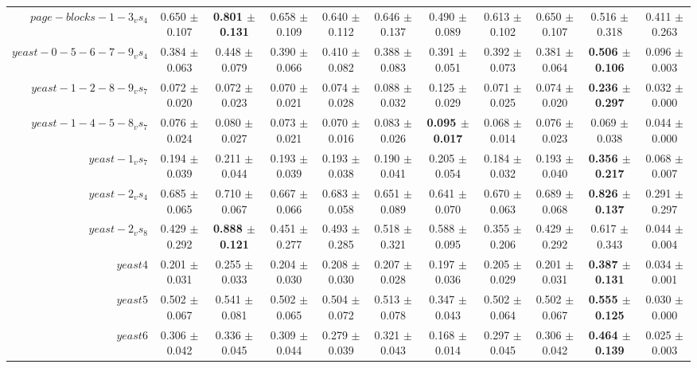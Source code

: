 \begin{table}[!ht]
{\begin{tabular}{r c c c c c c c c c c}
$page-blocks-1-3_vs_4$ & 0.650 $\pm$ 0.107 & \textbf{0.801 $\pm$ 0.131} & 0.658 $\pm$ 0.109 & 0.640 $\pm$ 0.112 & 0.646 $\pm$ 0.137 & 0.490 $\pm$ 0.089 & 0.613 $\pm$ 0.102 & 0.650 $\pm$ 0.107 & 0.516 $\pm$ 0.318 & 0.411 $\pm$ 0.263 \\
$yeast-0-5-6-7-9_vs_4$ & 0.384 $\pm$ 0.063 & 0.448 $\pm$ 0.079 & 0.390 $\pm$ 0.066 & 0.410 $\pm$ 0.082 & 0.388 $\pm$ 0.083 & 0.391 $\pm$ 0.051 & 0.392 $\pm$ 0.073 & 0.381 $\pm$ 0.064 & \textbf{0.506 $\pm$ 0.106} & 0.096 $\pm$ 0.003 \\
$yeast-1-2-8-9_vs_7$ & 0.072 $\pm$ 0.020 & 0.072 $\pm$ 0.023 & 0.070 $\pm$ 0.021 & 0.074 $\pm$ 0.028 & 0.088 $\pm$ 0.032 & 0.125 $\pm$ 0.029 & 0.071 $\pm$ 0.025 & 0.074 $\pm$ 0.020 & \textbf{0.236 $\pm$ 0.297} & 0.032 $\pm$ 0.000 \\
$yeast-1-4-5-8_vs_7$ & 0.076 $\pm$ 0.024 & 0.080 $\pm$ 0.027 & 0.073 $\pm$ 0.021 & 0.070 $\pm$ 0.016 & 0.083 $\pm$ 0.026 & \textbf{0.095 $\pm$ 0.017} & 0.068 $\pm$ 0.014 & 0.076 $\pm$ 0.023 & 0.069 $\pm$ 0.038 & 0.044 $\pm$ 0.000 \\
$yeast-1_vs_7$ & 0.194 $\pm$ 0.039 & 0.211 $\pm$ 0.044 & 0.193 $\pm$ 0.039 & 0.193 $\pm$ 0.038 & 0.190 $\pm$ 0.041 & 0.205 $\pm$ 0.054 & 0.184 $\pm$ 0.032 & 0.193 $\pm$ 0.040 & \textbf{0.356 $\pm$ 0.217} & 0.068 $\pm$ 0.007 \\
$yeast-2_vs_4$ & 0.685 $\pm$ 0.065 & 0.710 $\pm$ 0.067 & 0.667 $\pm$ 0.066 & 0.683 $\pm$ 0.058 & 0.651 $\pm$ 0.089 & 0.641 $\pm$ 0.070 & 0.670 $\pm$ 0.063 & 0.689 $\pm$ 0.068 & \textbf{0.826 $\pm$ 0.137} & 0.291 $\pm$ 0.297 \\
$yeast-2_vs_8$ & 0.429 $\pm$ 0.292 & \textbf{0.888 $\pm$ 0.121} & 0.451 $\pm$ 0.277 & 0.493 $\pm$ 0.285 & 0.518 $\pm$ 0.321 & 0.588 $\pm$ 0.095 & 0.355 $\pm$ 0.206 & 0.429 $\pm$ 0.292 & 0.617 $\pm$ 0.343 & 0.044 $\pm$ 0.004 \\
$yeast4$ & 0.201 $\pm$ 0.031 & 0.255 $\pm$ 0.033 & 0.204 $\pm$ 0.030 & 0.208 $\pm$ 0.030 & 0.207 $\pm$ 0.028 & 0.197 $\pm$ 0.036 & 0.205 $\pm$ 0.029 & 0.201 $\pm$ 0.031 & \textbf{0.387 $\pm$ 0.131} & 0.034 $\pm$ 0.001 \\
$yeast5$ & 0.502 $\pm$ 0.067 & 0.541 $\pm$ 0.081 & 0.502 $\pm$ 0.065 & 0.504 $\pm$ 0.072 & 0.513 $\pm$ 0.078 & 0.347 $\pm$ 0.043 & 0.502 $\pm$ 0.064 & 0.502 $\pm$ 0.067 & \textbf{0.555 $\pm$ 0.125} & 0.030 $\pm$ 0.000 \\
$yeast6$ & 0.306 $\pm$ 0.042 & 0.336 $\pm$ 0.045 & 0.309 $\pm$ 0.044 & 0.279 $\pm$ 0.039 & 0.321 $\pm$ 0.043 & 0.168 $\pm$ 0.014 & 0.297 $\pm$ 0.045 & 0.306 $\pm$ 0.042 & \textbf{0.464 $\pm$ 0.139} & 0.025 $\pm$ 0.003 \\

\end{tabular}}
\end{table}
